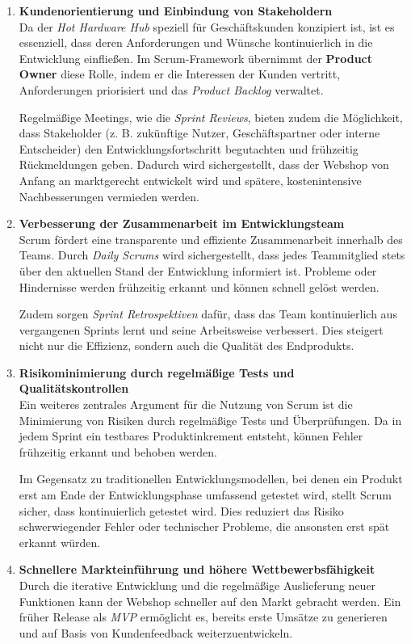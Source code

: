 \documentclass[%
	12pt,
	a4paper,
	oneside,
	parskip=full
]{scrbook}
\begin{document}
\begin{enumerate}
	\item \textbf{Kundenorientierung und Einbindung von Stakeholdern} \\
	Da der \textit{Hot Hardware Hub} speziell für Geschäftskunden konzipiert ist, ist es essenziell, dass deren Anforderungen und Wünsche kontinuierlich in die Entwicklung einfließen. Im Scrum-Framework übernimmt der \textbf{Product Owner} diese Rolle, indem er die Interessen der Kunden vertritt, Anforderungen priorisiert und das \textit{Product Backlog} verwaltet.
	
	Regelmäßige Meetings, wie die \textit{Sprint Reviews}, bieten zudem die Möglichkeit, dass Stakeholder (z. B. zukünftige Nutzer, Geschäftspartner oder interne Entscheider) den Entwicklungsfortschritt begutachten und frühzeitig Rückmeldungen geben. Dadurch wird sichergestellt, dass der Webshop von Anfang an marktgerecht entwickelt wird und spätere, kostenintensive Nachbesserungen vermieden werden.
	
	\item \textbf{Verbesserung der Zusammenarbeit im Entwicklungsteam} \\
	Scrum fördert eine transparente und effiziente Zusammenarbeit innerhalb des Teams. Durch \textit{Daily Scrums} wird sichergestellt, dass jedes Teammitglied stets über den aktuellen Stand der Entwicklung informiert ist. Probleme oder Hindernisse werden frühzeitig erkannt und können schnell gelöst werden.
	
	Zudem sorgen \textit{Sprint Retrospektiven} dafür, dass das Team kontinuierlich aus vergangenen Sprints lernt und seine Arbeitsweise verbessert. Dies steigert nicht nur die Effizienz, sondern auch die Qualität des Endprodukts.
	
	\item \textbf{Risikominimierung durch regelmäßige Tests und Qualitätskontrollen} \\
	Ein weiteres zentrales Argument für die Nutzung von Scrum ist die Minimierung von Risiken durch regelmäßige Tests und Überprüfungen. Da in jedem Sprint ein testbares Produktinkrement entsteht, können Fehler frühzeitig erkannt und behoben werden.
	
	Im Gegensatz zu traditionellen Entwicklungsmodellen, bei denen ein Produkt erst am Ende der Entwicklungsphase umfassend getestet wird, stellt Scrum sicher, dass kontinuierlich getestet wird. Dies reduziert das Risiko schwerwiegender Fehler oder technischer Probleme, die ansonsten erst spät erkannt würden.
	
	\item \textbf{Schnellere Markteinführung und höhere Wettbewerbsfähigkeit} \\
	Durch die iterative Entwicklung und die regelmäßige Auslieferung neuer Funktionen kann der Webshop schneller auf den Markt gebracht werden. Ein früher Release als \textit{MVP} ermöglicht es, bereits erste Umsätze zu generieren und auf Basis von Kundenfeedback weiterzuentwickeln.
	

\end{enumerate}
\end{document}
